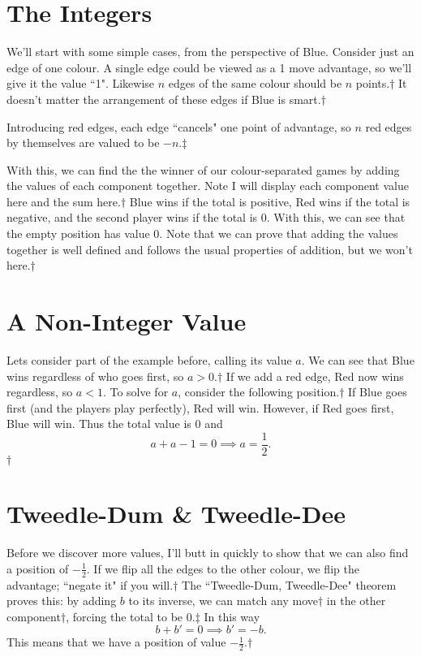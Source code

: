 \documentclass[]{article}
\newcommand{\nextslide}{$\dagger$}
\newcommand{\nextslides}{$\ddagger$}
\begin{document}
\section{The Integers}
We'll start with some simple cases, from the perspective of Blue. Consider just an edge of one colour. A single edge could be viewed as a 1 move advantage, so we'll give it the value ``1". Likewise $n$ edges of the same colour should be $n$ points.\nextslide{} It doesn't matter the arrangement of these edges if Blue is smart.\nextslide{}

Introducing red edges, each edge ``cancels" one point of advantage, so $n$ red edges by themselves are valued to be $-n$.\nextslides{}

With this, we can find the the winner of our colour-separated games by adding the values of each component together. Note I will display each component value here and the sum here.\nextslide{} Blue wins if the total is positive, Red wins if the total is negative, and the second player wins if the total is 0. With this, we can see that the empty position has value 0. Note that we can prove that adding the values together is well defined and follows the usual properties of addition, but we won't here.\nextslide{}

\section{A Non-Integer Value}
Lets consider part of the example before, calling its value $a$. We can see that Blue wins regardless of who goes first, so $a>0$.\nextslide{} If we add a red edge, Red now wins regardless, so $a<1$. To solve for $a$, consider the following position.\nextslide{} If Blue goes first (and the players play perfectly), Red will win. However, if Red goes first, Blue will win. Thus the total value is 0 and $$a+a-1=0 \implies a=\frac{1}{2}.$$\nextslide{}

\section{Tweedle-Dum \& Tweedle-Dee}
Before we discover more values, I'll butt in quickly to show that we can also find a position of $-\frac{1}{2}$. If we flip all the edges to the other colour, we flip the advantage; ``negate it" if you will.\nextslide{} The ``Tweedle-Dum, Tweedle-Dee" theorem proves this: by adding $b$ to its inverse, we can match any move\nextslide{} in the other component\nextslide{}, forcing the total to be 0.\nextslides{} In this way $$b + b' = 0 \implies b' = -b.$$ This means that we have a position of value $-\frac{1}{2}$.\nextslide{}
\end{document}
